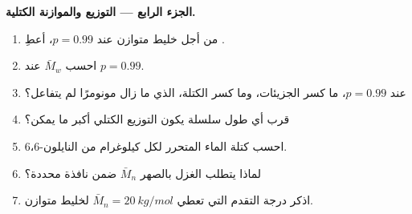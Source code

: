 \begin{problem}
\medskip
\noindent\textbf{الجزء الرابع --- التوزيع والموازنة الكتلية.}
\begin{enumerate}[resume]
  \item من أجل خليط متوازن عند $p = 0.99$، أعطِ .
  \item احسب $\bar M_w$ عند $p = 0.99$.
  \item عند $p = 0.99$، ما كسر الجزيئات، وما كسر الكتلة، الذي ما زال مونومرًا
        لم يتفاعل؟
  \item قرب أي طول سلسلة يكون التوزيع الكتلي أكبر ما يمكن؟
  \item احسب كتلة الماء المتحرر لكل كيلوغرام من النايلون-6،6.
  \item لماذا يتطلب الغزل بالصهر $\bar M_n$ ضمن نافذة محددة؟
  \item اذكر درجة التقدم التي تعطي $\bar M_n = \qty{20}{kg/mol}$ لخليط متوازن.
\end{enumerate}
\end{problem}
